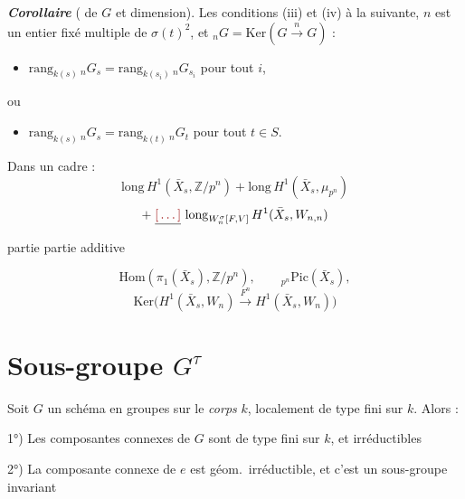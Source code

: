 \documentclass[11pt,a4paper]{article}
\begin{document}
\textbf{\emph{Corollaire}} (\struck{\ill{}}  de $G$
 et  dimension). Les conditions (iii) et
(iv)  \ill{} à la suivante,  $n$ est un
entier fixé \struck{\ill{}} multiple de $\sigma(t)^2$, et
${}_nG = \mathrm{Ker}(G \xrightarrow{n} G)$ :
\begin{itemize}
  \item[(v)] $\mathrm{rang}_{k(s)}\, {}_nG_s = \mathrm{rang}_{k(s_i)}\, {}_nG_{s_i}$
    pour tout $i$,
\end{itemize}
ou
\begin{itemize}
  \item[(v bis)] $\mathrm{rang}_{k(s)}\, {}_nG_s = \mathrm{rang}_{k(t)}\, {}_nG_t$
    pour tout $t \in S$.
\end{itemize}


Dans un cadre :
\[
  \mathrm{long}\, H^1(\bar{X}_s, \mathbb{Z}/p^n)
  + \mathrm{long}\, H^1(\bar{X}_s, \mu_{p^n})
\]
\[
  + \;\struck{\ill{}}\ \mathrm{long}_{W_n^\sigma[F,V]}\, H^1(\bar{X}_s, W_{n,n})
\]
partie  \quad partie additive 

\[
  \mathrm{Hom}(\pi_1(\bar{X}_s), \mathbb{Z}/p^n) , \qquad
  {}_{p^n}\mathrm{Pic}(\bar{X}_s) ,
\]
\[
  \mathrm{Ker}\bigl(H^1(\bar{X}_s, W_n) \xrightarrow{F^n} H^1(\bar{X}_s, W_n)\bigr)
\]

\section{Sous-groupe $G^\tau$}

Soit $G$ un schéma en groupes sur le \emph{corps} $k$, localement de type fini sur
$k$. Alors :


1°) Les composantes connexes  de $G$ sont de type fini sur $k$, et
irréductibles

2°) La composante connexe  de $e$ est géom.\ irréductible,
et c'est un sous-groupe invariant \struck{\ill{}}
\end{document}

